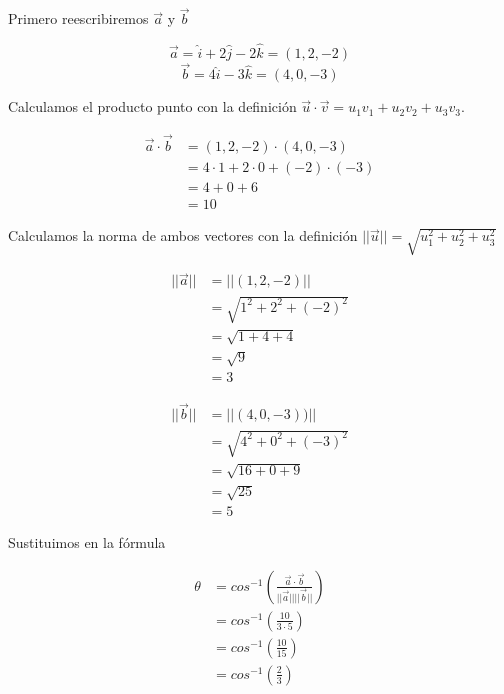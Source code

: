 \documentclass[12pt]{article}
\begin{document}
Primero reescribiremos $\vec{a}$ y $\vec{b}$

\[
\vec{a} =  \hat{i} + 2\hat{j}-2\hat{k} = (1, 2, -2)
\]
\[
\vec{b} =4\hat{i} -3\hat{k}= (4, 0, -3)
\]

Calculamos el producto punto con la definición  $\vec{u} \cdot \vec{v} = u_1v_1 + u_2v_2+u_3v_3$.

\begin{equation*}
  \begin{split}
    \vec{a} \cdot \vec{b}  &= (1, 2, -2) \cdot  (4, 0, -3)  \\
    &= 4 \cdot 1 + 2 \cdot 0 + (-2) \cdot (-3) \\
    &= 4 + 0 +6 \\
    &= 10 
  \end{split}
\end{equation*}

Calculamos la norma de ambos vectores con la definición $ ||\vec{u}|| = \sqrt{u_1^2 + u_2^2 + u_3^2} $

\begin{equation*}
  \begin{split}
    ||\vec{a}||  &= ||(1, 2, -2)||  \\
    &= \sqrt{1^2 + 2^2 + (-2)^2} \\
    &= \sqrt{1 + 4 + 4} \\
    &= \sqrt{9} \\
    &=3
  \end{split}
\end{equation*}

\begin{equation*}
  \begin{split}
    ||\vec{b}||  &= ||(4, 0, -3))||  \\
    &= \sqrt{4^2 + 0^2 + (-3)^2} \\
    &= \sqrt{16 + 0 + 9} \\
    &= \sqrt{25} \\
    &= 5
  \end{split}
\end{equation*}

Sustituimos en la fórmula

\begin{equation*}
  \begin{split}
    \theta &= cos^{-1 }\left(\frac{\vec{a} \cdot \vec{b}}{||\vec{a}|| ||\vec{b}||}\right) \\
    &=  cos^{-1 }\left(\frac{10}{3 \cdot 5} \right) \\
    &= cos^{-1 }\left(\frac{10}{15} \right) \\
    &= cos^{-1 }\left(\frac{2}{3} \right) \\
  \end{split}
\end{equation*}
\end{document}

